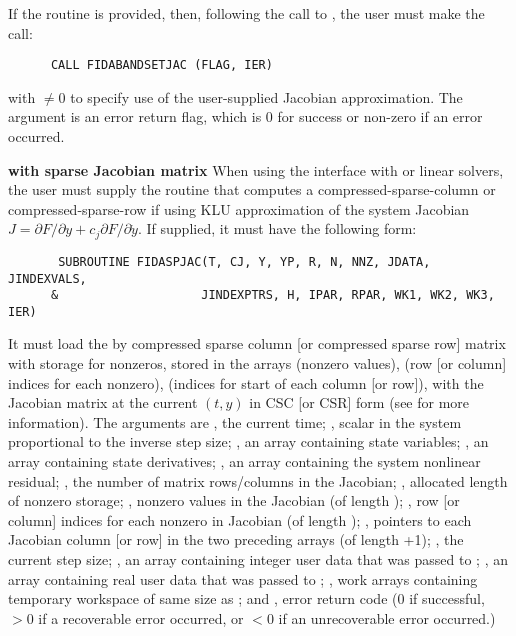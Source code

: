 \begin{Steps}
  If the  routine is provided, then, following the call to
  , the user must make the call:
\begin{verbatim}
      CALL FIDABANDSETJAC (FLAG, IER)
\end{verbatim}
  with  $\neq 0$ to specify use of the user-supplied Jacobian
  approximation.  The argument  is an error return flag, which is $0$
  for success or non-zero if an error occurred.


  {\bf {\idadls} with sparse Jacobian matrix}
   When using the {\idadls} interface with {\sunlinsolklu} or
  {\sunlinsolslumt} linear solvers, the user must
  supply the  routine that computes a
  compressed-sparse-column or compressed-sparse-row if using KLU
  approximation of the system Jacobian
  $J = \partial F / \partial y + c_j \partial F / \partial \dot{y}$.
  If supplied, it must have the following form:
\begin{verbatim}
       SUBROUTINE FIDASPJAC(T, CJ, Y, YP, R, N, NNZ, JDATA, JINDEXVALS,
      &                    JINDEXPTRS, H, IPAR, RPAR, WK1, WK2, WK3, IER)
\end{verbatim}
  It must load the  by 
  compressed sparse column  [or compressed sparse row] matrix
  with storage for  nonzeros, stored in the arrays  (nonzero
  values),  (row [or column] indices for each nonzero),  (indices
  for start of each column [or row]), with the Jacobian matrix at the current
  $(t, y)$ in CSC [or CSR] form (see  for more information).
 The arguments are , the current time; , scalar in the system
 proportional to the inverse step size; , an array containing
 state variables; , an array containing state derivatives;
 , an array containing the system nonlinear residual;
 , the number of matrix rows/columns
 in the Jacobian; , allocated length of nonzero storage; ,
 nonzero values in the Jacobian (of length );
 , row [or column] indices for each nonzero in Jacobian (of length );
 , pointers to each Jacobian column [or row] in the two preceding arrays
 (of length +1); , the current step size;
 , an array containing integer user data that was
 passed to ; , an array containing real user
 data that was passed to ;
 , work arrays containing temporary workspace
 of same size as ; and , error return code (0 if successful,
 $>0$ if a recoverable error occurred, or $<0$ if an unrecoverable error occurred.)



\end{Steps}
